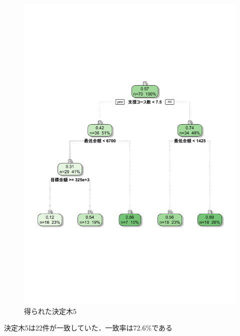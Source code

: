 \begin{figure}[H]
\centering
\includegraphics[width=13cm]{figure27.pdf}
\caption{得られた決定木5}\label{sannp}
\end{figure}

決定木5は22件が一致していた．一致率は72.6\%である

